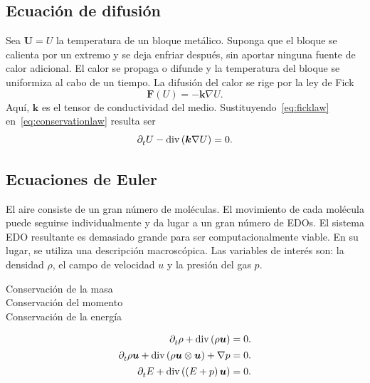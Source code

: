 \subsection*{Ecuación de difusión}

Sea $\bm{U}=U$ la temperatura de un bloque metálico.
Suponga que el bloque se calienta por un extremo y se deja enfriar
después, sin aportar ninguna fuente de calor adicional.
El calor se propaga o difunde y la temperatura del bloque se
uniformiza al cabo de un tiempo.
La difusión del calor se rige por la ley de Fick
\begin{equation}\label{eq:ficklaw}
    \bm{F}\left(U\right)=
    -\bm{k}\nabla U.
\end{equation}
Aquí, $\bm{k}$ es el tensor de conductividad del medio.
Sustituyendo~\eqref{eq:ficklaw} en~\eqref{eq:conservationlaw}
resulta ser
\begin{equation*}
    \difcp{U}{t}-
    \operatorname{div}
    \left(\bm{k}\nabla U\right)=
    0.
\end{equation*}

\subsection*{Ecuaciones de Euler}

El aire consiste de un gran número de moléculas.
El movimiento de cada molécula puede seguirse individualmente y
da lugar a un gran número de EDOs.
El sistema EDO resultante es demasiado grande para ser
computacionalmente viable.
En su lugar, se utiliza una descripción macroscópica.
Las variables de interés son: la densidad $\rho$, el campo de
velocidad $u$ y la presión del gas $p$.

\begin{description}
    \item[Conservación de la masa]

    \item[Conservación del momento]

    \item[Conservación de la energía]
\end{description}

\begin{align*}
    \difcp{\rho}{t}+
    \operatorname{div}
    \left(\rho\bm{u}\right)                       & =0. \\
    \difcp{\rho\bm{u}}{t}+
    \operatorname{div}
    \left(\rho\bm{u}\otimes\bm{u}\right)+\nabla p & =0. \\
    \difcp{E}{t}+
    \operatorname{div}
    \left(\left(E+p\right)\bm{u}\right)           & =0.
\end{align*}

